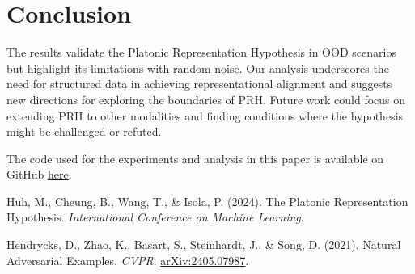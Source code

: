 \documentclass[10pt,a4paper]{article}
\begin{document}
\section{Conclusion}
The results validate the Platonic Representation Hypothesis in OOD scenarios but highlight its limitations with random noise. Our analysis underscores the need for structured data in achieving representational alignment and suggests new directions for exploring the boundaries of PRH. Future work could focus on extending PRH to other modalities and finding conditions where the hypothesis might be challenged or refuted.

\vfill
The code used for the experiments and analysis in this paper is available on GitHub \href{https://github.com/rokosbasilisk/prh-experiments}{here}.

\clearpage
\begin{thebibliography}{9}

Huh, M., Cheung, B., Wang, T., \& Isola, P. (2024). The Platonic Representation Hypothesis. \emph{International Conference on Machine Learning}.

Hendrycks, D., Zhao, K., Basart, S., Steinhardt, J., \& Song, D. (2021). Natural Adversarial Examples. \emph{CVPR}. \href{https://arxiv.org/abs/2405.07987}{arXiv:2405.07987}.


\end{thebibliography}
\end{document}
